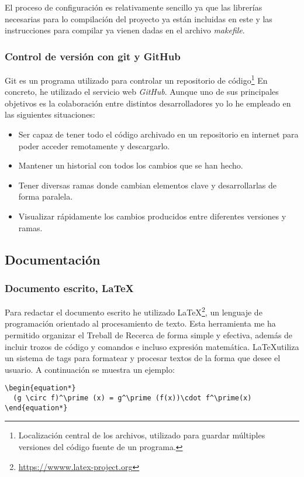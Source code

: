 El proceso de configuración es relativamente sencillo ya que las librerías necesarias para lo compilación del proyecto ya están incluidas en este y las instrucciones para compilar ya vienen dadas en el archivo \textit{makefile}.

\subsubsection{Control de versión con git y GitHub}
Git es un programa utilizado para controlar un repositorio de código\footnote{Localización central de los archivos, utilizado para guardar múltiples versiones del código fuente de un programa.} En concreto, he utilizado el servicio web \textit{GitHub}. Aunque uno de sus principales objetivos es la colaboración entre distintos desarrolladores yo lo he empleado en las siguientes situaciones:
\begin{itemize}
\item{Ser capaz de tener todo el código archivado en un repositorio en internet para poder acceder remotamente y descargarlo.}
\item{Mantener un historial con todos los cambios que se han hecho.}
\item{Tener diversas ramas donde cambian elementos clave y desarrollarlas de forma paralela.}
\item{Visualizar rápidamente los cambios producidos entre diferentes versiones y ramas.}
\end{itemize}
\subsection{Documentación}
\subsubsection{Documento escrito, \LaTeX}
Para redactar el documento escrito he utilizado \LaTeX \footnote{\url{https://wwww.latex-project.org}}, un lenguaje de programación orientado al procesamiento de texto. Esta herramienta me ha permitido organizar el Treball de Recerca de forma simple y efectiva, además de incluir trozos de código y comandos e incluso expresión matemática. \LaTeX utiliza un sistema de tags para formatear y procesar textos de la forma que desee el usuario. A continuación se muestra un ejemplo:
\begin{lstlisting}
\begin{equation*}
  (g \circ f)^\prime (x) = g^\prime (f(x))\cdot f^\prime(x)
\end{equation*}  
\end{lstlisting}

